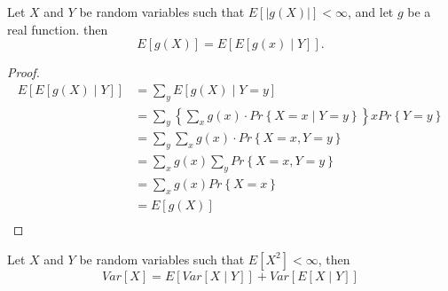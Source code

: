 \documentclass{article}
\theoremstyle{remark}
\begin{document}
   \begin{theorem}
     Let $X$ and $Y$ be random variables such that $E\left[ \left| g\left( X \right) \right| \right] < \infty$, and let $g$ be a real function. then \[
     E\left[ g\left( X \right)  \right] = E\left[ E\left[ g\left( x \right)  \mid  Y \right] \right] .
     \] 
   \end{theorem}
   \begin{proof}
     \[
       \begin{split}
     E\left[ E\left[ g\left( X \right)  \mid  Y \right] \right]   &=  \sum_{y}^{} E\left[ g\left( X \right)  \mid  Y =y \right] \\
     &=   \sum_{y}^{ }  \left\{ \sum_{x}^{} g\left( x \right) \cdot Pr \left \{ X = x  \mid  Y = y \right \} \right\} x Pr \left \{ Y =y \right \}  \\
     &=  \sum_{y}^{}  \sum_{x}^{}  g\left( x \right) \cdot  Pr \left \{ X =x , Y= y \right \}   \\
     &= \sum_{x}^{} g\left( x \right) \sum_{y}^{}  Pr \left \{ X =x, Y =y \right \}   \\
&= \sum_{x}^{}  g\left( x \right) Pr \left \{ X =x \right \}  \\
&= E\left[ g\left( X \right) \right]  \\
       \end{split} 
     \] 
   \end{proof}

   \begin{theorem}
     Let $X$ and $Y$ be random variables such that $E\left[ X^2 \right] < \infty$, then \[
     Var\left[ X \right] = E\left[ Var\left[ X  \mid  Y \right] \right] + Var \left[ E\left[ X  \mid Y \right] \right]
     \] 
   \end{theorem}
   
\end{document}
